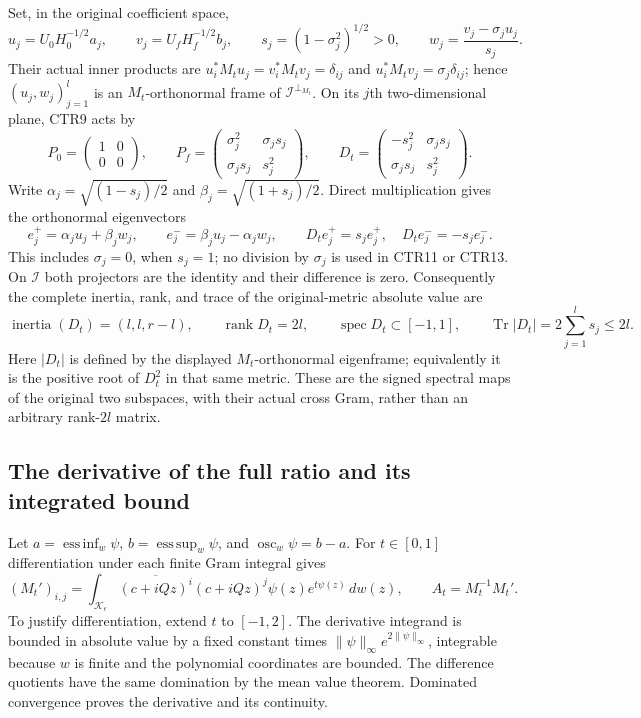 Set, in the original coefficient space,
\[
 u_j=U_0H_0^{-1/2}a_j,\qquad v_j=U_fH_f^{-1/2}b_j,\qquad
 s_j=(1-\sigma_j^2)^{1/2}>0,\qquad
 w_j=\frac{v_j-\sigma_ju_j}{s_j}.
 \tag{CTR11}
\]
Their actual inner products are
$u_i^*M_tu_j=v_i^*M_tv_j=\delta_{ij}$ and
$u_i^*M_tv_j=\sigma_j\delta_{ij}$; hence $(u_j,w_j)_{j=1}^l$ is an
$M_t$-orthonormal frame of $\mathcal I^{\perp_{M_t}}$.
On its $j$th two-dimensional plane, CTR9 acts by
\[
 P_0=\begin{pmatrix}1&0\\0&0\end{pmatrix},\qquad
 P_f=\begin{pmatrix}\sigma_j^2&\sigma_js_j\\\sigma_js_j&s_j^2\end{pmatrix},\qquad
 D_t=\begin{pmatrix}-s_j^2&\sigma_js_j\\\sigma_js_j&s_j^2\end{pmatrix}.
 \tag{CTR12}
\]
Write $\alpha_j=\sqrt{(1-s_j)/2}$ and
$\beta_j=\sqrt{(1+s_j)/2}$. Direct multiplication gives the orthonormal
eigenvectors
\[
 e_j^+=\alpha_ju_j+\beta_jw_j,\qquad
 e_j^-=\beta_ju_j-\alpha_jw_j,\qquad
 D_te_j^+=s_je_j^+,\quad D_te_j^-=-s_je_j^-.
 \tag{CTR13}
\]
This includes $\sigma_j=0$, when $s_j=1$; no division by $\sigma_j$
is used in CTR11 or CTR13. On $\mathcal I$ both projectors are the
identity and their difference is zero. Consequently the complete inertia,
rank, and trace of the original-metric absolute value are
\[
 \operatorname{inertia}(D_t)=(l,l,r-l),\qquad
 \operatorname{rank}D_t=2l,\qquad
 \operatorname{spec}D_t\subset[-1,1],\qquad
 \operatorname{Tr}|D_t|=2\sum_{j=1}^l s_j\leq2l.
 \tag{CTR14}
\]
Here $|D_t|$ is defined by the displayed $M_t$-orthonormal eigenframe;
equivalently it is the positive root of $D_t^2$ in that same metric.
These are the signed spectral maps of the original two subspaces,
with their actual cross Gram, rather than an arbitrary rank-$2l$ matrix.

\subsection{The derivative of the full ratio and its integrated bound}
Let $a=\operatorname*{ess\,inf}_w\psi$,
$b=\operatorname*{ess\,sup}_w\psi$, and $\operatorname{osc}_w\psi=b-a$.
For $t\in[0,1]$ differentiation under each finite Gram integral gives
\[
 (M_t')_{i,j}=\int_{\mathcal K_\epsilon}
       \overline{(c+iQz)^i}(c+iQz)^j\psi(z)e^{t\psi(z)}\,dw(z),\qquad
 A_t=M_t^{-1}M_t'.
 \tag{CTR15}
\]
To justify differentiation, extend $t$ to $[-1,2]$. The derivative
integrand is bounded in absolute value by a fixed constant times
$\|\psi\|_\infty e^{2\|\psi\|_\infty}$, integrable because $w$ is
finite and the polynomial coordinates are bounded. The difference
quotients have the same domination by the mean value theorem.
Dominated convergence proves the derivative and its continuity.

